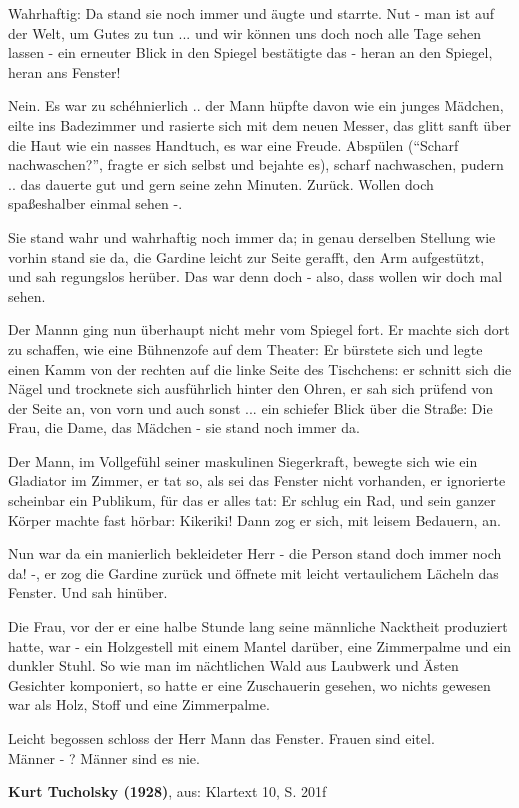 \documentclass[12pt,a4paper]{scrartcl}
\begin{document}
\begin{linenumbers}
Wahrhaftig: Da stand sie noch immer und äugte und starrte. Nut - man ist auf der Welt, um Gutes zu tun ... und wir können uns doch noch alle Tage sehen lassen - ein erneuter Blick in den Spiegel bestätigte das - heran an den Spiegel, heran ans Fenster!

Nein. Es war zu schéhnierlich .. der Mann hüpfte davon wie ein junges Mädchen, eilte ins Badezimmer und rasierte sich mit dem neuen Messer, das glitt sanft über die Haut wie ein nasses Handtuch, es war eine Freude. Abspülen ("`Scharf nachwaschen?"', fragte er sich selbst und bejahte es), scharf nachwaschen, pudern .. das dauerte gut und gern seine zehn Minuten. Zurück. Wollen doch spaßeshalber einmal sehen -.

Sie stand wahr und wahrhaftig noch immer da; in genau derselben Stellung wie vorhin stand sie da, die Gardine leicht zur Seite gerafft, den Arm aufgestützt, und sah regungslos herüber. Das war denn doch - also, dass wollen wir doch mal sehen. 

Der Mannn ging nun überhaupt nicht mehr vom Spiegel fort. Er machte sich dort zu schaffen, wie eine Bühnenzofe auf dem Theater: Er bürstete sich und legte einen Kamm von der rechten auf die linke Seite des Tischchens: er schnitt sich die Nägel und trocknete sich ausführlich hinter den Ohren, er sah sich prüfend von der Seite an, von vorn und auch sonst ... ein schiefer Blick über die Straße: Die Frau, die Dame, das Mädchen - sie stand noch immer da.

Der Mann, im Vollgefühl seiner maskulinen Siegerkraft, bewegte sich wie ein Gladiator im Zimmer, er tat so, als sei das Fenster nicht vorhanden, er ignorierte scheinbar ein Publikum, für das er alles tat: Er schlug ein Rad, und sein ganzer Körper machte fast hörbar: Kikeriki! Dann zog er sich, mit leisem Bedauern, an.

Nun war da ein manierlich bekleideter Herr - die Person stand doch immer noch da! -, er zog die Gardine zurück und öffnete mit leicht vertaulichem Lächeln das Fenster. Und sah hinüber.

Die Frau, vor der er eine halbe Stunde lang seine männliche Nacktheit produziert hatte, war - ein Holzgestell mit einem Mantel darüber, eine Zimmerpalme und ein dunkler Stuhl. So wie man im nächtlichen Wald aus Laubwerk und Ästen Gesichter komponiert, so hatte er eine Zuschauerin gesehen, wo nichts gewesen war als Holz, Stoff und eine Zimmerpalme.

Leicht begossen schloss der Herr Mann das Fenster. Frauen sind eitel. \\
Männer - ? Männer sind es nie.
\end{linenumbers}
\textbf{Kurt Tucholsky (1928)}, aus: Klartext 10, S. 201f
\end{document}
